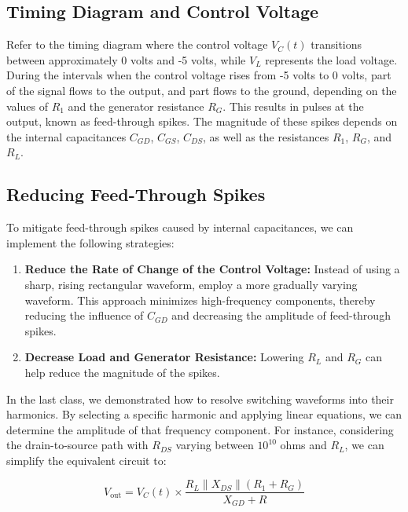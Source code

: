 \documentclass[a4paper,9pt,twoside,openany,twocolumn]{memoir}
\begin{document}
\subsection{Timing Diagram and Control Voltage}

Refer to the timing diagram where the control voltage \( V_C(t) \) transitions between approximately 0 volts and -5 volts, while \( V_L \) represents the load voltage. During the intervals when the control voltage rises from -5 volts to 0 volts, part of the signal flows to the output, and part flows to the ground, depending on the values of \( R_1 \) and the generator resistance \( R_G \). This results in pulses at the output, known as feed-through spikes. The magnitude of these spikes depends on the internal capacitances \( C_{GD} \), \( C_{GS} \), \( C_{DS} \), as well as the resistances \( R_1 \), \( R_G \), and \( R_L \).

\subsection{Reducing Feed-Through Spikes}

To mitigate feed-through spikes caused by internal capacitances, we can implement the following strategies:

\begin{enumerate}
    \item \textbf{Reduce the Rate of Change of the Control Voltage:} Instead of using a sharp, rising rectangular waveform, employ a more gradually varying waveform. This approach minimizes high-frequency components, thereby reducing the influence of \( C_{GD} \) and decreasing the amplitude of feed-through spikes.
    
    \item \textbf{Decrease Load and Generator Resistance:} Lowering \( R_L \) and \( R_G \) can help reduce the magnitude of the spikes. 
\end{enumerate}

In the last class, we demonstrated how to resolve switching waveforms into their harmonics. By selecting a specific harmonic and applying linear equations, we can determine the amplitude of that frequency component. For instance, considering the drain-to-source path with \( R_{DS} \) varying between \( 10^{10} \) ohms and \( R_L \), we can simplify the equivalent circuit to:

\[
V_{\text{out}} = V_C(t) \times \frac{R_L \parallel X_{DS} \parallel (R_1 + R_G)}{X_{GD} + R}
\]
\end{document}
